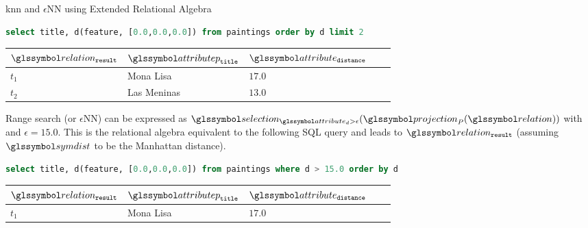 \begin{example}[label=example:proximity_based_queries]{\acrshort{knn} and $\epsilon$NN using Extended Relational Algebra}{}
    \begin{lstlisting}[language=SQL, showspaces=false, basicstyle=\ttfamily, numbers=none]
        select title, d(feature, [0.0,0.0,0.0]) from paintings order by d limit 2
    \end{lstlisting}

    \begin{center}
        \begin{tabular}{ l || l | l | l | l |}
            $\relation_{\mathtt{result}}$ & $\attributep_{\mathtt{title}}$  & $\attribute_{\mathtt{distance}}$ \\ 
            \hline
            \hline
            $t_1$ & Mona Lisa &  $17.0$ \\
            \hline
            $t_2$ & Las Meninas & $13.0$ \\
            \hline
        \end{tabular}
    \end{center}

    Range search (or $\epsilon$NN) can be expressed as $\selection_{\attribute_d > \epsilon}(\projection_{P} (\relation))$ with and $\epsilon = 15.0$. This is the relational algebra equivalent to the following SQL query and leads to $\relation_{\mathtt{result}}$ (assuming $ \symdist$ to be the Manhattan distance).

    \begin{lstlisting}[language=SQL, showspaces=false, basicstyle=\ttfamily, numbers=none]
        select title, d(feature, [0.0,0.0,0.0]) from paintings where d > 15.0 order by d
    \end{lstlisting}

    \begin{center}
        \begin{tabular}{ l || l | l | l | l |}
            $\relation_{\mathtt{result}}$ & $\attributep_{\mathtt{title}}$  & $\attribute_{\mathtt{distance}}$ \\ 
            \hline
            \hline
            $t_1$ & Mona Lisa &  $17.0$ \\
            \hline
        \end{tabular}
    \end{center}
\end{example}

